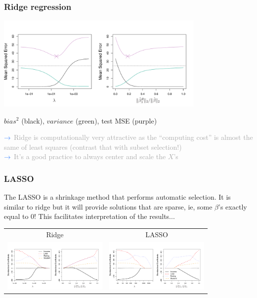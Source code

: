 \documentclass{beamer}
\newcommand{\lb}[1]{\textcolor{lightblue}{#1}}
\newcommand{\dg}[1]{\textcolor{darkgray}{#1}}
\newcommand{\ba}{$\lb{{\small \rightarrow } }$ \hspace{0.5mm}}
\newcommand{\sko}{\vspace{.1in}}
\newcommand{\skoo}{\vspace{.2in}}
\begin{document}
\begin{frame}
\frametitle{Ridge regression}
\vspace{-0.8cm}
\begin{center}
\includegraphics[width=4in]{6_5.pdf}
\end{center}
\vspace{-0.5cm}
$bias^2$ (black), $variance$ ({\color{green}green}), test MSE ({\color{magenta}purple})

\sko

\ba \dg{Ridge is computationally very attractive as the ``computing cost'' is almost the same of least squares (contrast that with subset selection!)} \\ \sko
\ba \dg{It's a good practice to always center and scale the $X$'s}

\end{frame}


\begin{frame}
\frametitle{LASSO}
The LASSO is a shrinkage method that performs automatic selection. It is similar to ridge but it will provide solutions that are {\color{red}sparse}, ie, some $\beta$'s exactly equal to 0! This facilitates interpretation of the results...

\skoo
\begin{tabular}{cc}
Ridge & LASSO\\
\includegraphics[width=2in]{6_4}&\includegraphics[width=2in]{6_6}\\
\end{tabular}

\end{frame}
\end{document}
